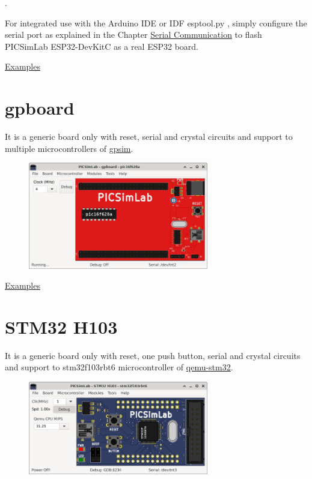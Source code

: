 .\vspace{0.5cm}

For integrated use with the Arduino IDE or IDF esptool.py , simply configure the serial port as explained 
in the Chapter \hyperlink{def:seriali}{Serial Communication} to flash PICSimLab ESP32-DevKitC as a real ESP32 board.

\href{https://lcgamboa.github.io/picsimlab_examples/board_ESP32_DevKitC.html}{Examples}


\section{gpboard}

It is a generic board only with reset, serial and crystal circuits and support to multiple microcontrollers 
of \href{http://gpsim.sourceforge.net/}{gpsim}.

\begin{figure}[H]
\center
\includegraphics[width=0.7\textwidth]{img/gpboard.png} 
\end{figure} 

\href{https://lcgamboa.github.io/picsimlab_examples/board_gpboard.html}{Examples}


\section{STM32 H103}

It is a generic board only with reset, one push button, serial and crystal circuits and support to stm32f103rbt6 microcontroller of 
\href{https://beckus.github.io/qemu_stm32/}{qemu-stm32}.

\begin{figure}[H]
\center
\includegraphics[width=0.7\textwidth]{img/STM32_H103.png} 
\end{figure} 

